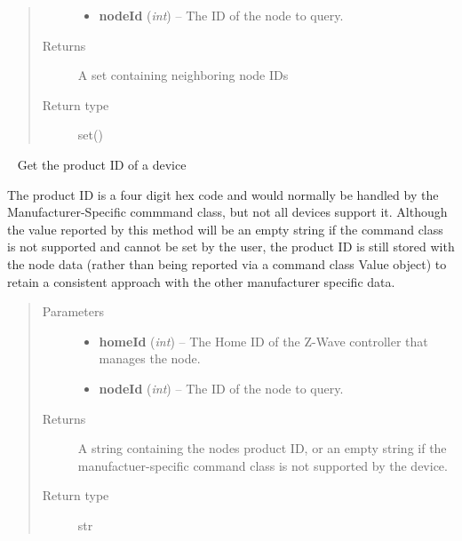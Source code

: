 \documentclass[letterpaper,10pt,english]{sphinxmanual}
\begin{document}
\begin{fulllineitems}
\begin{fulllineitems}
\begin{quote}
\begin{description}
\begin{itemize}
\item {} 
\textbf{nodeId} (\emph{int}) -- The ID of the node to query.

\end{itemize}

\item[{Returns}] \leavevmode
A set containing neighboring node IDs

\item[{Return type}] \leavevmode
set()

\end{description}\end{quote}

\end{fulllineitems}


\begin{fulllineitems}
\label{libopenzwave:libopenzwave.PyManager.getNodeProductId}~\label{libopenzwave:getnodeproductid}
Get the product ID of a device

The product ID is a four digit hex code and would normally be handled by the
Manufacturer-Specific commmand class, but not all devices support it.  Although
the value reported by this method will be an empty string if the command class
is not supported and cannot be set by the user, the product ID is still stored
with the node data (rather than being reported via a command class Value
object)  to retain a consistent approach with the other manufacturer specific
data.
\begin{quote}\begin{description}
\item[{Parameters}] \leavevmode\begin{itemize}
\item {} 
\textbf{homeId} (\emph{int}) -- The Home ID of the Z-Wave controller that manages the node.

\item {} 
\textbf{nodeId} (\emph{int}) -- The ID of the node to query.

\end{itemize}

\item[{Returns}] \leavevmode
A string containing the nodes product ID, or an empty string if the manufactuer-specific command class is not supported by the device.

\item[{Return type}] \leavevmode
str


\end{description}
\end{quote}
\end{fulllineitems}
\end{fulllineitems}
\end{document}
